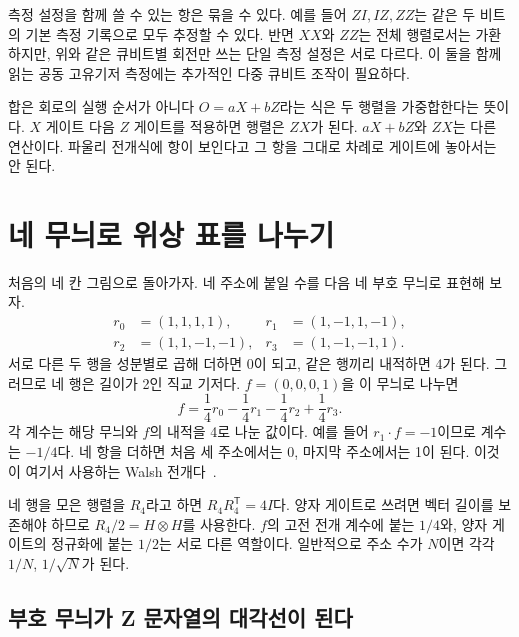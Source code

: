 측정 설정을 함께 쓸 수 있는 항은 묶을 수 있다.
예를 들어 \(ZI,IZ,ZZ\)는 같은 두 비트의 기본 측정 기록으로 모두 추정할 수 있다.
반면 \(XX\)와 \(ZZ\)는 전체 행렬로서는 가환하지만, 위와 같은 큐비트별 회전만 쓰는
단일 측정 설정은 서로 다르다. 이 둘을 함께 읽는 공동 고유기저 측정에는
추가적인 다중 큐비트 조작이 필요하다.

\begin{notebox}{합은 회로의 실행 순서가 아니다}
\(O=aX+bZ\)라는 식은 두 행렬을 가중합한다는 뜻이다.
\(X\) 게이트 다음 \(Z\) 게이트를 적용하면 행렬은 \(ZX\)가 된다.
\(aX+bZ\)와 \(ZX\)는 다른 연산이다. 파울리 전개식에 항이 보인다고
그 항을 그대로 차례로 게이트에 놓아서는 안 된다.
\end{notebox}

\section{네 무늬로 위상 표를 나누기}

처음의 네 칸 그림으로 돌아가자. 네 주소에 붙일 수를 다음 네 부호 무늬로 표현해 보자.
\[
\begin{aligned}
r_0&=(1,1,1,1),&r_1&=(1,-1,1,-1),\\
r_2&=(1,1,-1,-1),&r_3&=(1,-1,-1,1).
\end{aligned}
\]
서로 다른 두 행을 성분별로 곱해 더하면 0이 되고, 같은 행끼리 내적하면 4가 된다.
그러므로 네 행은 길이가 2인 직교 기저다.
\(f=(0,0,0,1)\)을 이 무늬로 나누면
\[
f=\frac14r_0-\frac14r_1-\frac14r_2+\frac14r_3.
\]
각 계수는 해당 무늬와 \(f\)의 내적을 4로 나눈 값이다.
예를 들어 \(r_1\cdot f=-1\)이므로 계수는 \(-1/4\)다.
네 항을 더하면 처음 세 주소에서는 0, 마지막 주소에서는 1이 된다.
이것이 여기서 사용하는 Walsh 전개다~\cite{welch}.


네 행을 모은 행렬을 \(R_4\)라고 하면 \(R_4R_4^\mathsf T=4I\)다.
양자 게이트로 쓰려면 벡터 길이를 보존해야 하므로 \(R_4/2=H\otimes H\)를 사용한다.
\(f\)의 고전 전개 계수에 붙는 \(1/4\)와, 양자 게이트의 정규화에 붙는 \(1/2\)는
서로 다른 역할이다. 일반적으로 주소 수가 \(N\)이면 각각 \(1/N\), \(1/\sqrt N\)가 된다.

\subsection{부호 무늬가 Z 문자열의 대각선이 된다}

